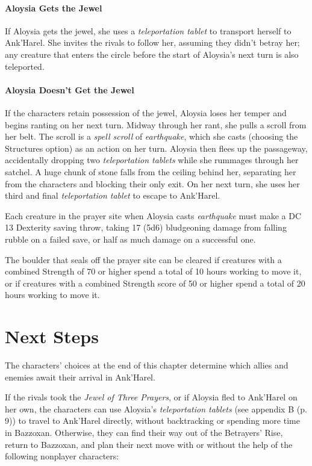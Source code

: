 \documentclass[letterpaper, 11pt, bg=full, twocolumn]{dndbook}
\begin{document}
\paragraph{Aloysia Gets the Jewel}

If Aloysia gets the jewel, she uses a \textit{teleportation tablet} to transport herself to Ank'Harel. She invites the rivals to follow her, assuming they didn't betray her; any creature that enters the circle before the start of Aloysia's next turn is also teleported.

\paragraph{Aloysia Doesn't Get the Jewel}

If the characters retain possession of the jewel, Aloysia loses her temper and begins ranting on her next turn. Midway through her rant, she pulls a scroll from her belt. The scroll is a \textit{spell scroll} of \textit{earthquake}, which she casts (choosing the Structures option) as an action on her turn. Aloysia then flees up the passageway, accidentally dropping two \textit{teleportation tablets} while she rummages through her satchel. A huge chunk of stone falls from the ceiling behind her, separating her from the characters and blocking their only exit. On her next turn, she uses her third and final \textit{teleportation tablet} to escape to Ank'Harel.

Each creature in the prayer site when Aloysia casts \textit{earthquake} must make a DC 13 Dexterity saving throw, taking 17 (5d6) bludgeoning damage from falling rubble on a failed save, or half as much damage on a successful one.

The boulder that seals off the prayer site can be cleared if creatures with a combined Strength of 70 or higher spend a total of 10 hours working to move it, or if creatures with a combined Strength score of 50 or higher spend a total of 20 hours working to move it.
\section{Next Steps}

The characters' choices at the end of this chapter determine which allies and enemies await their arrival in Ank'Harel.

If the rivals took the \textit{Jewel of Three Prayers}, or if Aloysia fled to Ank'Harel on her own, the characters can use Aloysia's \textit{teleportation tablets} (see appendix B (p. 9)) to travel to Ank'Harel directly, without backtracking or spending more time in Bazzoxan. Otherwise, they can find their way out of the Betrayers' Rise, return to Bazzoxan, and plan their next move with or without the help of the following nonplayer characters:
\end{document}
